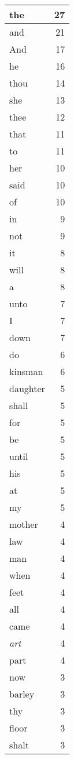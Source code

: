 \begin{center}
\begin{longtable}{l|r}
\hline \hline
\endlastfoot
the & 27 \\ \hline
and & 21 \\ \hline
And & 17 \\ \hline
he & 16 \\ \hline
thou & 14 \\ \hline
she & 13 \\ \hline
thee & 12 \\ \hline
that & 11 \\ \hline
to & 11 \\ \hline
her & 10 \\ \hline
said & 10 \\ \hline
of & 10 \\ \hline
in & 9 \\ \hline
not & 9 \\ \hline
it & 8 \\ \hline
will & 8 \\ \hline
a & 8 \\ \hline
unto & 7 \\ \hline
I & 7 \\ \hline
down & 7 \\ \hline
do & 6 \\ \hline
kinsman & 6 \\ \hline
daughter & 5 \\ \hline
shall & 5 \\ \hline
for & 5 \\ \hline
be & 5 \\ \hline
until & 5 \\ \hline
his & 5 \\ \hline
at & 5 \\ \hline
my & 5 \\ \hline
mother & 4 \\ \hline
law & 4 \\ \hline
man & 4 \\ \hline
when & 4 \\ \hline
feet & 4 \\ \hline
all & 4 \\ \hline
came & 4 \\ \hline
\emph{art} & 4 \\ \hline
part & 4 \\ \hline
now & 3 \\ \hline
barley & 3 \\ \hline
thy & 3 \\ \hline
floor & 3 \\ \hline
shalt & 3 \\ \hline

\end{longtable}
\end{center}
